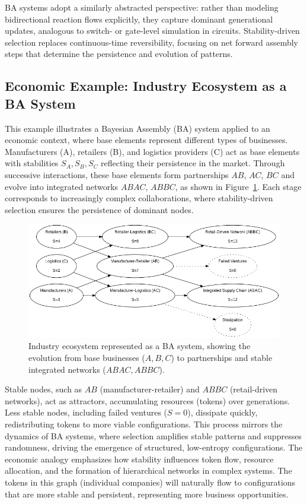 \documentclass[entropy,article,submit,pdftex,moreauthors]{Definitions/mdpi}
\begin{document}
BA systems adopt a similarly abstracted perspective: rather than modeling bidirectional reaction flows explicitly, they capture dominant generational updates, analogous to switch- or gate-level simulation in circuits. Stability-driven selection replaces continuous-time reversibility, focusing on net forward assembly steps that determine the persistence and evolution of patterns.

\subsection{Economic Example: Industry Ecosystem as a BA System}

This example illustrates a Bayesian Assembly (BA) system applied to an economic context, where base elements represent different types of businesses. Manufacturers (A), retailers (B), and logistics providers (C) act as base elements with stabilities \( S_A, S_B, S_C \) reflecting their persistence in the market. Through successive interactions, these base elements form partnerships \( AB \), \( AC \), \( BC \) and evolve into integrated networks \( ABAC \), \( ABBC \), as shown in Figure~\ref{fig:ba_economic}. Each stage corresponds to increasingly complex collaborations, where stability-driven selection ensures the persistence of dominant nodes. 

\begin{figure}[h]
    \centering
    \includegraphics[width=1\textwidth]{abc_eco.png}
    \caption{Industry ecosystem represented as a BA system, showing the evolution from base businesses (\( A, B, C \)) to partnerships and stable integrated networks (\( ABAC, ABBC \)).}
    \label{fig:ba_economic}
\end{figure}

Stable nodes, such as \( AB \) (manufacturer-retailer) and \( ABBC \) (retail-driven networks), act as attractors, accumulating resources (tokens) over generations. Less stable nodes, including failed ventures (\( S=0 \)), dissipate quickly, redistributing tokens to more viable configurations. This process mirrors the dynamics of BA systems, where selection amplifies stable patterns and suppresses randomness, driving the emergence of structured, low-entropy configurations. The economic analogy emphasizes how stability influences token flow, resource allocation, and the formation of hierarchical networks in complex systems. The tokens in this graph (individual companies) will naturally flow to configurations that are more stable and persistent, representing more business opportunities.
\end{document}
